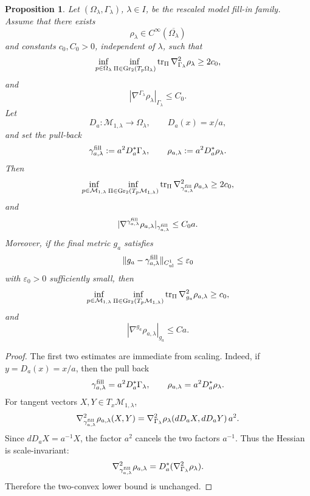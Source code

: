 \documentclass{amsart}
\newtheorem{proposition}{Proposition}[section]
\begin{document}
{\begin{proposition}
\label{lem:two-convex-exhaustion-fill-in}
Let \((\Omega_\lambda,\Gamma_\lambda)\), \(\lambda\in I\), be the
rescaled model fill-in family. Assume that there exists
\[
        \rho_\lambda\in C^\infty(\overline{\Omega_\lambda})
\]
and constants \(c_0,C_0>0\), independent of \(\lambda\), such that
\[
        \inf_{p\in\Omega_\lambda}
        \inf_{\Pi\in {\rm Gr}_2(T_p\Omega_\lambda)}
        \operatorname{tr}_{\Pi}\nabla^2_{\Gamma_\lambda}\rho_\lambda
        \ge 2c_0,
\]
and
\[
        |\nabla^{\Gamma_\lambda}\rho_\lambda|_{\Gamma_\lambda}
        \le C_0 .
\]
Let
\[
        D_a:\mathcal M_{1,\lambda}\to\Omega_\lambda,
        \qquad
        D_a(x)=x/a,
\]
and set the pull-back
\[
        \gamma^{\rm fill}_{a,\lambda}:=a^2D_a^*\Gamma_\lambda,
        \qquad
        \rho_{a,\lambda}:=a^2D_a^*\rho_\lambda .
\]
Then
\[
        \inf_{p\in\mathcal M_{1,\lambda}}
        \inf_{\Pi\in{\rm Gr}_2(T_p\mathcal M_{1,\lambda})}
        \operatorname{tr}_{\Pi}
        \nabla^2_{\gamma^{\rm fill}_{a,\lambda}}\rho_{a,\lambda}
        \ge 2c_0,
\]
and
\[
        |\nabla^{\gamma^{\rm fill}_{a,\lambda}}\rho_{a,\lambda}|
        _{\gamma^{\rm fill}_{a,\lambda}}
        \le C_0 a .
\]
Moreover, if the final metric \(g_a\) satisfies
\[
        \|g_a-\gamma^{\rm fill}_{a,\lambda}\|_{C^1_{\rm ul}}
        \le \varepsilon_0
\]
with \(\varepsilon_0>0\) sufficiently small, then
\[
        \inf_{p\in\mathcal M_{1,\lambda}}
        \inf_{\Pi\in{\rm Gr}_2(T_p\mathcal M_{1,\lambda})}
        \operatorname{tr}_{\Pi}\nabla^2_{g_a}\rho_{a,\lambda}
        \ge c_0,
\]
and
\[
        |\nabla^{g_a}\rho_{a,\lambda}|_{g_a}\le C a .
\]
\end{proposition}

\begin{proof}
The first two estimates are immediate from scaling. Indeed, if
\(y=D_a(x)=x/a\), then the pull back
\[
        \gamma^{\rm fill}_{a,\lambda}=a^2D_a^*\Gamma_\lambda,
        \qquad
        \rho_{a,\lambda}=a^2D_a^*\rho_\lambda .
\]
For tangent vectors \(X,Y\in T_x\mathcal M_{1,\lambda}\),
\[
        \nabla^2_{\gamma^{\rm fill}_{a,\lambda}}\rho_{a,\lambda}(X,Y)
        =
        \nabla^2_{\Gamma_\lambda}\rho_\lambda(dD_aX,dD_aY)\,a^2.
\]
Since \(dD_aX=a^{-1}X\), the factor \(a^2\) cancels the two factors
\(a^{-1}\). Thus the Hessian is scale-invariant:
\[
        \nabla^2_{\gamma^{\rm fill}_{a,\lambda}}\rho_{a,\lambda}
        =
        D_a^*(\nabla^2_{\Gamma_\lambda}\rho_\lambda).
\]
Therefore the two-convex lower bound is unchanged.


\end{proof}}
\end{document}
